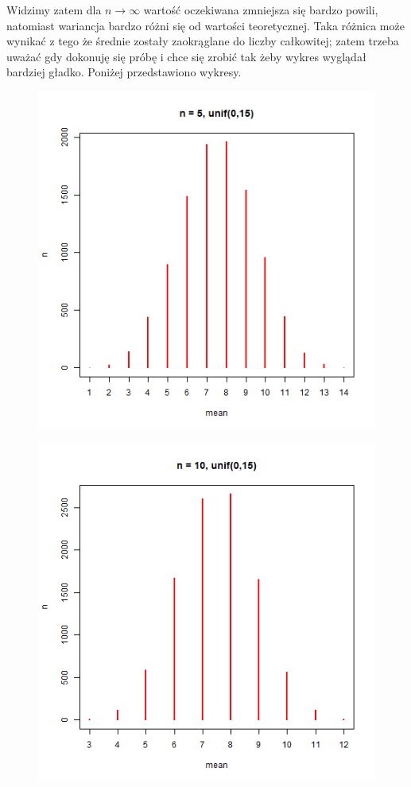 \documentclass{article}
\begin{document}
Widzimy zatem dla $n \rightarrow \infty$ wartość oczekiwana zmniejsza się bardzo powili, natomiast wariancja bardzo różni się od wartości teoretycznej. Taka różnica może wynikać z tego że średnie zostały zaokrąglane do liczby całkowitej; zatem trzeba uważać gdy dokonuję się próbę i chce się zrobić tak żeby wykres wyglądał bardziej gładko. Poniżej przedstawiono wykresy.

\begin{figure}[h!]
\begin{center}
\includegraphics[height=0.4\textheight, angle=0]{"n5_1.png"}
\end{center}
\end{figure}

\newpage
\begin{figure}[h!]
\begin{center}
\includegraphics[height=0.4\textheight, angle=0]{"n10_1.png"}
\end{center}
\end{figure}
\end{document}
